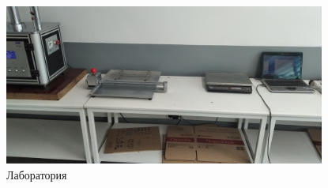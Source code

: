 




\begin{figure}
\begin{center}
  \includegraphics[height=0.94\textheight, width=0.94\textwidth, keepaspectratio]{Pics 1/6 Приборы.jpg}
\end{center}
  \caption{Лаборатория}
  \label{pic:6 Приборы}
\end{figure}

